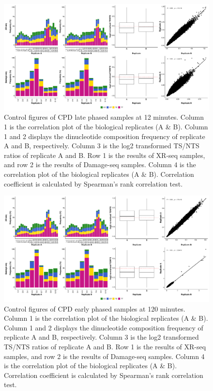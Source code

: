 \begin{figure}[H]
    \begin{center}
    \includegraphics[width=\textwidth]{Chapters/7_appendix/figures/supfig7}
    \caption[Control figures of CPD late phased samples at 12 minutes.]{Control figures of CPD late phased samples at 12 minutes. Column 1 is the correlation plot of the biological replicates (A \& B). Column 1 and 2 displays the dinucleotide composition frequency of replicate A and B, respectively. Column 3 is the log2 transformed TS/NTS ratios of replicate A and B. Row 1 is the results of XR-seq samples, and row 2 is the results of Damage-seq samples. Column 4 is the correlation plot of the biological replicates (A \& B). Correlation coefficient is calculated by Spearman’s rank correlation test.}
    \label{supfig:control6}
    \end{center}
    \end{figure}

\begin{figure}[H]
    \begin{center}
    \includegraphics[width=\textwidth]{Chapters/7_appendix/figures/supfig8}
    \caption[Control figures of CPD early phased samples at 120 minutes.]{Control figures of CPD early phased samples at 120 minutes. Column 1 is the correlation plot of the biological replicates (A \& B). Column 1 and 2 displays the dinucleotide composition frequency of replicate A and B, respectively. Column 3 is the log2 transformed TS/NTS ratios of replicate A and B. Row 1 is the results of XR-seq samples, and row 2 is the results of Damage-seq samples. Column 4 is the correlation plot of the biological replicates (A \& B). Correlation coefficient is calculated by Spearman’s rank correlation test.}
    \label{supfig:control7}
    \end{center}
    \end{figure}

